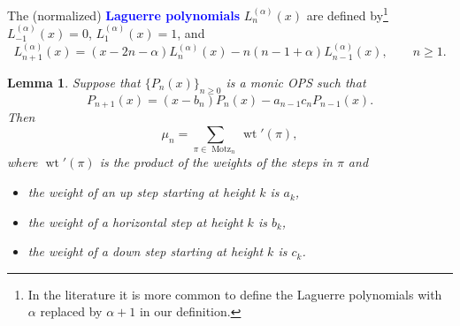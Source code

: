 \documentclass[oneside]{book}
\numberwithin{equation}{section}
\newtheorem{lem}[thm]{Lemma}
\theoremstyle{definition}
\newcommand\Motz{\operatorname{Motz}}
\newcommand\wt{\operatorname{wt}}
\renewcommand\emph[1]{\textcolor{blue}{\bf #1}}
\begin{document}
The (normalized) \emph{Laguerre polynomials} \( L^{(\alpha)}_n(x) \)
are defined by\footnote{In the literature it is more common to define
  the Laguerre polynomials with \( \alpha \) replaced by
  \( \alpha+1 \) in our definition.} \( L^{(\alpha)}_{-1}(x) =0 \),
\( L^{(\alpha)}_{1}(x) =1 \), and
\[
  L^{(\alpha)}_{n+1}(x) = (x-2n-\alpha) L^{(\alpha)}_n(x) - n(n-1+\alpha) L^{(\alpha)}_{n-1}(x), \qquad n\ge1.
\]


\begin{lem}\label{lem:1}
  Suppose that \( \{ P_n(x) \}_{n\ge 0} \) is a monic OPS such that
  \[
    P_{n+1}(x) = (x-b_n) P_n(x) - a_{n-1}c_n P_{n-1}(x).
  \]
  Then
  \[
    \mu_n = \sum_{\pi\in \Motz_n} \wt'(\pi),
  \]
  where \( \wt'(\pi) \) is the product of the weights of the steps in \( \pi \) and
  \begin{itemize}
  \item the weight of an up step starting at height \( k \) is \( a_k \),
  \item the weight of a horizontal step at height \( k \) is \( b_k \),
  \item the weight of a down step starting at height \( k \) is \( c_k \).
  \end{itemize}
\end{lem}
\end{document}
